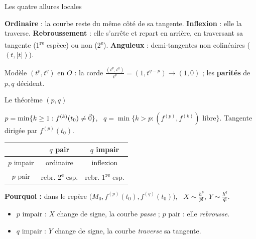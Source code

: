 \documentclass[aspectratio=169,11pt]{beamer}
\begin{document}
\begin{frame}{Les quatre allures locales}
\begin{center}
\end{center}
\pause
\begin{DEF}
\textbf{Ordinaire} : la courbe reste du même côté de sa tangente. \textbf{Inflexion} : elle la traverse.
\textbf{Rebroussement} : elle s'arrête et repart en arrière, en traversant sa tangente (1\textsuperscript{re} espèce) ou non
(2\textsuperscript{e}). \textbf{Anguleux} : demi-tangentes non colinéaires ($(t,|t|)$).
\end{DEF}
\pause
Modèle $(t^p,t^q)$ en $O$ : la corde $\frac{(t^p,t^q)}{t^p}=(1,t^{q-p})\to(1,0)$ ; les \textbf{parités} de $p,q$ décident.
\end{frame}

\begin{frame}{Le théorème $(p,q)$}
\begin{PROP}[Théorème $(p,q)$]
$p=\min\{k\geq1:f^{(k)}(t_0)\neq\vec{0}\}$, \ $q=\min\{k>p:(f^{(p)},f^{(k)})\text{ libre}\}$. Tangente dirigée par $f^{(p)}(t_0)$.
\begin{center}
\renewcommand{\arraystretch}{1.2}
\begin{tabular}{c|cc}
 & $q$ pair & $q$ impair\\\hline
$p$ impair & ordinaire & inflexion\\
$p$ pair & rebr. 2\textsuperscript{e} esp. & rebr. 1\textsuperscript{re} esp.
\end{tabular}
\end{center}
\end{PROP}
\pause
\textbf{Pourquoi :} dans le repère $\big(M_0,f^{(p)}(t_0),f^{(q)}(t_0)\big)$, \ $X\sim\frac{h^p}{p!}$, $Y\sim\frac{h^q}{q!}$.
\begin{itemize}
\item $p$ impair : $X$ change de signe, la courbe \emph{passe} ; $p$ pair : elle \emph{rebrousse}.
\item $q$ impair : $Y$ change de signe, la courbe \emph{traverse} sa tangente.
\end{itemize}
\end{frame}
\end{document}

